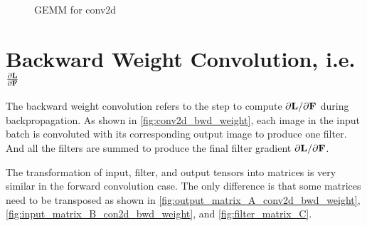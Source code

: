 {}
\begin{figure}[!h]
  \centering
  \caption{GEMM for conv2d}
  \label{fig:conv2d_GEMM}
\end{figure}



\section{Backward Weight Convolution, i.e. $\frac{\partial \bold{L}}{\partial \bold{F}}$}
The backward weight convolution refers to the step to compute $\partial \bold{L}/\partial \bold{F}$
during backpropagation.
As shown in \Fig \ref{fig:conv2d_bwd_weight}, each image in the input batch is convoluted
with its corresponding output image to produce one filter.
And all the filters are summed to produce the final filter gradient $\partial \bold{L}/\partial \bold{F}$.

The transformation of input, filter, and output tensors into matrices is very similar in
the forward convolution case.
The only difference is that some matrices need to be transposed as shown in
\Fig \ref{fig:output_matrix_A_conv2d_bwd_weight}, \ref{fig:input_matrix_B_con2d_bwd_weight},
and \ref{fig:filter_matrix_C}.

